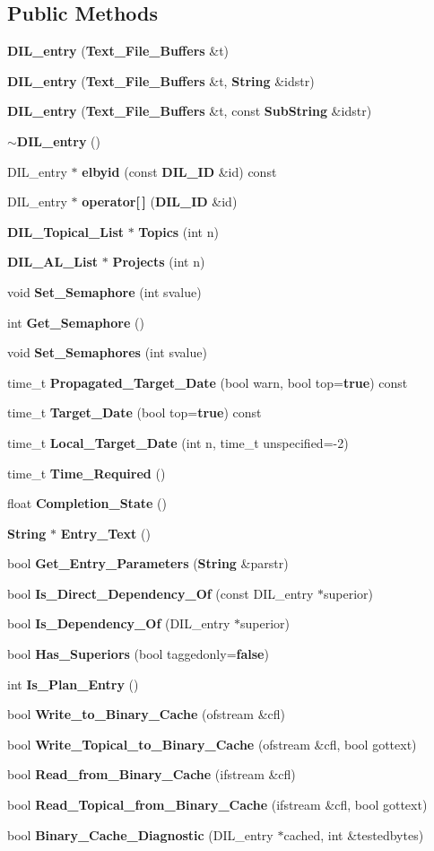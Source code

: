 \subsection*{Public Methods}
\begin{CompactItemize}
\item 
{\bf DIL\_\-entry} ({\bf Text\_\-File\_\-Buffers} \&t)
\item 
{\bf DIL\_\-entry} ({\bf Text\_\-File\_\-Buffers} \&t, {\bf String} \&idstr)
\item 
{\bf DIL\_\-entry} ({\bf Text\_\-File\_\-Buffers} \&t, const {\bf Sub\-String} \&idstr)
\item 
{\bf $\sim$DIL\_\-entry} ()
\item 
DIL\_\-entry $\ast$ {\bf elbyid} (const {\bf DIL\_\-ID} \&id) const
\item 
DIL\_\-entry $\ast$ {\bf operator[$\,$]} ({\bf DIL\_\-ID} \&id)
\item 
{\bf DIL\_\-Topical\_\-List} $\ast$ {\bf Topics} (int n)
\item 
{\bf DIL\_\-AL\_\-List} $\ast$ {\bf Projects} (int n)
\item 
void {\bf Set\_\-Semaphore} (int svalue)
\item 
int {\bf Get\_\-Semaphore} ()
\item 
void {\bf Set\_\-Semaphores} (int svalue)
\item 
time\_\-t {\bf Propagated\_\-Target\_\-Date} (bool warn, bool top={\bf true}) const
\item 
time\_\-t {\bf Target\_\-Date} (bool top={\bf true}) const
\item 
time\_\-t {\bf Local\_\-Target\_\-Date} (int n, time\_\-t unspecified=-2)
\item 
time\_\-t {\bf Time\_\-Required} ()
\item 
float {\bf Completion\_\-State} ()
\item 
{\bf String} $\ast$ {\bf Entry\_\-Text} ()
\item 
bool {\bf Get\_\-Entry\_\-Parameters} ({\bf String} \&parstr)
\item 
bool {\bf Is\_\-Direct\_\-Dependency\_\-Of} (const DIL\_\-entry $\ast$superior)
\item 
bool {\bf Is\_\-Dependency\_\-Of} (DIL\_\-entry $\ast$superior)
\item 
bool {\bf Has\_\-Superiors} (bool taggedonly={\bf false})
\item 
int {\bf Is\_\-Plan\_\-Entry} ()
\item 
bool {\bf Write\_\-to\_\-Binary\_\-Cache} (ofstream \&cfl)
\item 
bool {\bf Write\_\-Topical\_\-to\_\-Binary\_\-Cache} (ofstream \&cfl, bool gottext)
\item 
bool {\bf Read\_\-from\_\-Binary\_\-Cache} (ifstream \&cfl)
\item 
bool {\bf Read\_\-Topical\_\-from\_\-Binary\_\-Cache} (ifstream \&cfl, bool gottext)
\item 
bool {\bf Binary\_\-Cache\_\-Diagnostic} (DIL\_\-entry $\ast$cached, int \&testedbytes)
\end{CompactItemize}

